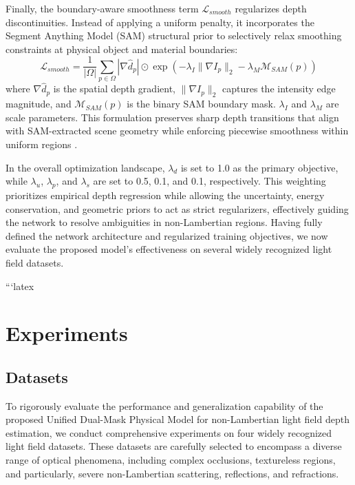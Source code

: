 \documentclass[lettersize,journal]{IEEEtran}
\begin{document}
Finally, the boundary-aware smoothness term $\mathcal{L}_{smooth}$ regularizes depth discontinuities. Instead of applying a uniform penalty, it incorporates the Segment Anything Model (SAM) \cite{kirillov2023} structural prior to selectively relax smoothing constraints at physical object and material boundaries:
\begin{equation}
\mathcal{L}_{smooth} = \frac{1}{|\Omega|} \sum_{p \in \Omega} |\nabla \hat{d}_p| \odot \exp\left(-\lambda_I \|\nabla I_p\|_2 - \lambda_M \mathcal{M}_{SAM}(p)\right)
\end{equation}
where $\nabla \hat{d}_p$ is the spatial depth gradient, $\|\nabla I_p\|_2$ captures the intensity edge magnitude, and $\mathcal{M}_{SAM}(p)$ is the binary SAM boundary mask. $\lambda_I$ and $\lambda_M$ are scale parameters. This formulation preserves sharp depth transitions that align with SAM-extracted scene geometry while enforcing piecewise smoothness within uniform regions \cite{wang2015}. 

In the overall optimization landscape, $\lambda_{d}$ is set to 1.0 as the primary objective, while $\lambda_{u}$, $\lambda_{p}$, and $\lambda_{s}$ are set to 0.5, 0.1, and 0.1, respectively. This weighting prioritizes empirical depth regression while allowing the uncertainty, energy conservation, and geometric priors to act as strict regularizers, effectively guiding the network to resolve ambiguities in non-Lambertian regions. Having fully defined the network architecture and regularized training objectives, we now evaluate the proposed model's effectiveness on several widely recognized light field datasets.

```latex
\section{Experiments}

\subsection{Datasets}
To rigorously evaluate the performance and generalization capability of the proposed Unified Dual-Mask Physical Model for non-Lambertian light field depth estimation, we conduct comprehensive experiments on four widely recognized light field datasets. These datasets are carefully selected to encompass a diverse range of optical phenomena, including complex occlusions, textureless regions, and particularly, severe non-Lambertian scattering, reflections, and refractions. 
\end{document}
